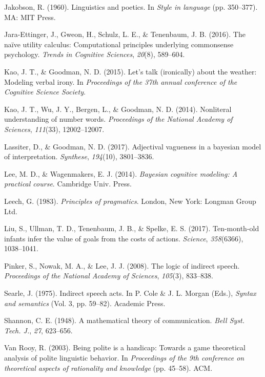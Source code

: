 \documentclass[floatsintext,mask,man]{apa6}
\theoremstyle{definition}
\theoremstyle{definition}
\theoremstyle{definition}
\theoremstyle{remark}
\begin{document}
\hypertarget{ref-jakobson1960}{}
Jakobson, R. (1960). Linguistics and poetics. In \emph{Style in
language} (pp. 350--377). MA: MIT Press.

\hypertarget{ref-jara2016naive}{}
Jara-Ettinger, J., Gweon, H., Schulz, L. E., \& Tenenbaum, J. B. (2016).
The naïve utility calculus: Computational principles underlying
commonsense psychology. \emph{Trends in Cognitive Sciences},
\emph{20}(8), 589--604.

\hypertarget{ref-kao2015}{}
Kao, J. T., \& Goodman, N. D. (2015). Let's talk (ironically) about the
weather: Modeling verbal irony. In \emph{Proceedings of the 37th annual
conference of the Cognitive Science Society}.

\hypertarget{ref-kao2014}{}
Kao, J. T., Wu, J. Y., Bergen, L., \& Goodman, N. D. (2014). Nonliteral
understanding of number words. \emph{Proceedings of the National Academy
of Sciences}, \emph{111}(33), 12002--12007.

\hypertarget{ref-lassiter2017adjectival}{}
Lassiter, D., \& Goodman, N. D. (2017). Adjectival vagueness in a
bayesian model of interpretation. \emph{Synthese}, \emph{194}(10),
3801--3836.

\hypertarget{ref-lee2014}{}
Lee, M. D., \& Wagenmakers, E. J. (2014). \emph{Bayesian cognitive
modeling: A practical course}. Cambridge Univ. Press.

\hypertarget{ref-leech1983}{}
Leech, G. (1983). \emph{Principles of pragmatics}. London, New York:
Longman Group Ltd.

\hypertarget{ref-liu2017ten}{}
Liu, S., Ullman, T. D., Tenenbaum, J. B., \& Spelke, E. S. (2017).
Ten-month-old infants infer the value of goals from the costs of
actions. \emph{Science}, \emph{358}(6366), 1038--1041.

\hypertarget{ref-pinker2008}{}
Pinker, S., Nowak, M. A., \& Lee, J. J. (2008). The logic of indirect
speech. \emph{Proceedings of the National Academy of Sciences},
\emph{105}(3), 833--838.

\hypertarget{ref-searle1975}{}
Searle, J. (1975). Indirect speech acts. In P. Cole \& J. L. Morgan
(Eds.), \emph{Syntax and semantics} (Vol. 3, pp. 59--82). Academic
Press.

\hypertarget{ref-shannon1948}{}
Shannon, C. E. (1948). A mathematical theory of communication.
\emph{Bell Syst. Tech. J.}, \emph{27}, 623--656.

\hypertarget{ref-vanRooy2003}{}
Van Rooy, R. (2003). Being polite is a handicap: Towards a game
theoretical analysis of polite linguistic behavior. In \emph{Proceedings
of the 9th conference on theoretical aspects of rationality and
knowledge} (pp. 45--58). ACM.
\end{document}
